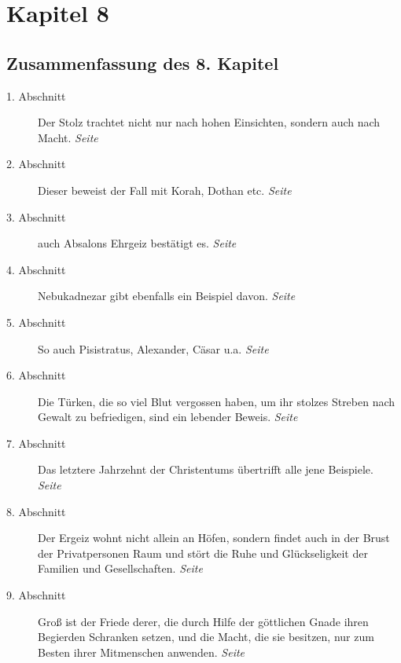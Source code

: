 
\chapter{Kapitel 8} \label{kap8}

\section{Zusammenfassung des 8. Kapitel}


\begin{description}
\item[1. Abschnitt] Der Stolz trachtet nicht nur nach hohen Einsichten, sondern
auch nach Macht.
\dotfill \textit{Seite~\pageref{kap8_ab1}}\\
\item[2. Abschnitt] Dieser beweist der Fall mit Korah, Dothan etc.
\dotfill \textit{Seite~\pageref{kap8_ab2}}\\
\item[3. Abschnitt] auch Absalons Ehrgeiz bestätigt es.
\dotfill \textit{Seite~\pageref{kap8_ab3}}\\
\item[4. Abschnitt] Nebukadnezar gibt ebenfalls ein Beispiel davon.
\dotfill \textit{Seite~\pageref{kap8_ab4}}\\
\item[5. Abschnitt] So auch Pisistratus, Alexander, Cäsar u.a.
\dotfill \textit{Seite~\pageref{kap8_ab5}}\\
\item[6. Abschnitt] Die Türken, die so viel Blut vergossen haben, um ihr stolzes
Streben nach Gewalt zu befriedigen, sind ein lebender Beweis.
\dotfill \textit{Seite~\pageref{kap8_ab6}}\\
\item[7. Abschnitt] Das letztere Jahrzehnt der Christentums übertrifft alle
jene Beispiele.
\dotfill \textit{Seite~\pageref{kap8_ab7}}\\
\item[8. Abschnitt] Der Ergeiz wohnt nicht allein an Höfen, sondern findet auch
in der Brust der Privatpersonen Raum und stört die Ruhe und Glückseligkeit der
Familien und Gesellschaften.
\dotfill \textit{Seite~\pageref{kap8_ab8}}\\
\item[9. Abschnitt] Groß ist der Friede derer, die durch Hilfe der göttlichen
Gnade ihren Begierden Schranken setzen, und die Macht, die sie besitzen, nur zum
Besten ihrer Mitmenschen anwenden.
\dotfill \textit{Seite~\pageref{kap8_ab9}}\\

\end{description}

